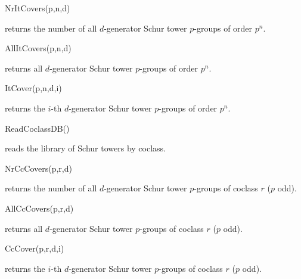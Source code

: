 \> NrItCovers(p,n,d)

returns the number of all $d$-generator Schur tower $p$-groups of order $p^n$.

\> AllItCovers(p,n,d)

returns all $d$-generator Schur tower $p$-groups of order $p^n$.

\> ItCover(p,n,d,i)

returns the $i$-th $d$-generator Schur tower $p$-groups of order $p^n$.

\> ReadCoclassDB()

reads the library of Schur towers by coclass.

\> NrCcCovers(p,r,d)

returns the number of all $d$-generator Schur tower $p$-groups of 
coclass $r$ ($p$ odd).

\> AllCcCovers(p,r,d)

returns all $d$-generator Schur tower $p$-groups of coclass $r$ ($p$ odd).

\> CcCover(p,r,d,i)

returns the $i$-th $d$-generator Schur tower $p$-groups of coclass $r$ 
($p$ odd).
